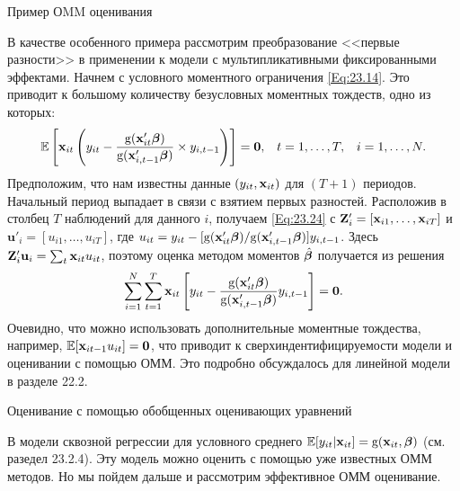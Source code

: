 {\centering Пример ОMM оценивания \\}

В качестве особенного примера рассмотрим преобразование <<первые разности>> в применении к модели с мультипликативными фиксированными эффектами. Начнем с условного моментного ограничения \ref{Eq:23.14}. Это приводит к большому количеству безусловных моментных тождеств, одно из которых:
\begin{align}
 \mathbb{E} \left[ \mathbf{x}_{it} \left( y_{it} - \frac{\mathrm g(\mathbf{x}'_{it}\bm{\beta})}{\mathrm g(\mathbf{x}'_{i,t-1}\bm{\beta})}\times y_{i,t-1} \right) \right]  = \mathbf{0}, &
& t=1, \dots, T, &
& i=1, \dots, N.
\nonumber 
\end{align}
Предположим, что нам известны данные $(y_{it},\mathbf{x}_{it})$ для $(T+1)$ периодов. Начальный период выпадает в связи с взятием первых разностей. Расположив в столбец $T$ наблюдений для данного $i$, получаем \ref{Eq:23.24} с $\mathbf{Z}'_i=[\mathbf{x}_{i1}, \dots, \mathbf{x}_{iT}]$ и $\mathbf{u}'_i=[u_{i1}, \dots, u_{iT}]$, где $u_{it}=y_{it}-[\mathrm g(\mathbf{x}'_{it}\bm{\beta})/\mathrm g(\mathbf{x}'_{i,t-1}\bm{\beta})]y_{i,t-1}$. Здесь $\mathbf{Z}'_i\mathbf{u}_i=\sum_t \mathbf{x}_{it}u_{it}$, поэтому оценка методом моментов $\hat{\bm{\beta}}$ получается из решения
\begin{align}
\sum_{i=1}^N \sum^T_{t=1} \mathbf{x}_{it} \left[ y_{it} - \frac{\mathrm g(\mathbf{x}'_{it}\bm{\beta})}{\mathrm g(\mathbf{x}'_{i,t-1}\bm{\beta})} y_{i,t-1} \right]=\mathbf{0}.
\nonumber
\end{align}
Очевидно, что можно использовать дополнительные моментные тождества, например, $\mathbb{E}[\mathbf{x}_{it-1}u_{it}]=\mathbf{0}$, что приводит к сверхиндентифицируемости модели и оценивании с помощью ОММ. Это подробно обсуждалось для линейной модели в разделе 22.2.

{\centering Оценивание  с помощью обобщенных оценивающих уравнений \\}

В модели сквозной регрессии для условного среднего $\mathbb{E}[y_{it}|\mathbf{x}_{it}]=\mathrm g(\mathbf{x}_{it}, \bm{\beta})$ (см. разедел 23.2.4). Эту модель можно оценить с помощью уже известных ОММ методов. Но мы пойдем дальше и рассмотрим эффективное ОММ оценивание.

